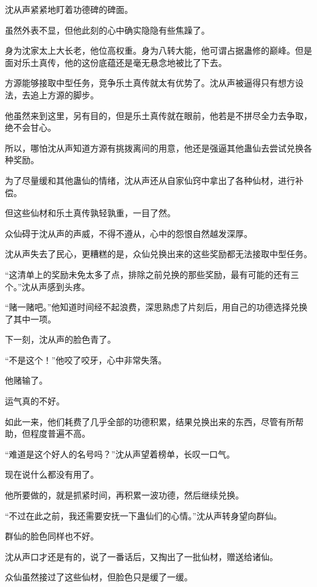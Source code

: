 
\begin{this_body}

沈从声紧紧地盯着功德碑的碑面。

虽然外表不显，但他此刻的心中确实隐隐有些焦躁了。

身为沈家太上大长老，他位高权重。身为八转大能，他可谓占据蛊修的巅峰。但是面对乐土真传，他的这份底蕴还是毫无悬念地被比了下去。

方源能够接取中型任务，竞争乐土真传就太有优势了。沈从声被逼得只有想方设法，去追上方源的脚步。

他虽然来到这里，另有目的，但是乐土真传就在眼前，他若是不拼尽全力去争取，绝不会甘心。

所以，哪怕沈从声知道方源有挑拨离间的用意，他还是强逼其他蛊仙去尝试兑换各种奖励。

为了尽量缓和其他蛊仙的情绪，沈从声还从自家仙窍中拿出了各种仙材，进行补偿。

但这些仙材和乐土真传孰轻孰重，一目了然。

众仙碍于沈从声的声威，不得不遵从，心中的怨恨自然越发深厚。

沈从声失去了民心，更糟糕的是，众仙兑换出来的这些奖励都无法接取中型任务。

“这清单上的奖励未免太多了点，排除之前兑换的那些奖励，最有可能的还有三个。”沈从声感到头疼。

“赌一赌吧。”他知道时间经不起浪费，深思熟虑了片刻后，用自己的功德选择兑换了其中一项。

下一刻，沈从声的脸色青了。

“不是这个！”他咬了咬牙，心中非常失落。

他赌输了。

运气真的不好。

如此一来，他们耗费了几乎全部的功德积累，结果兑换出来的东西，尽管有所帮助，但程度普遍不高。

“难道是这个好人的名号吗？”沈从声望着榜单，长叹一口气。

现在说什么都没有用了。

他所要做的，就是抓紧时间，再积累一波功德，然后继续兑换。

“不过在此之前，我还需要安抚一下蛊仙们的心情。”沈从声转身望向群仙。

群仙的脸色同样也不好。

沈从声口才还是有的，说了一番话后，又掏出了一批仙材，赠送给诸仙。

众仙虽然接过了这些仙材，但脸色只是缓了一缓。


\end{this_body}
